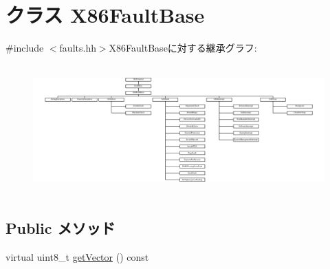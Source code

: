 \hypertarget{classX86ISA_1_1X86FaultBase}{
\section{クラス X86FaultBase}
\label{classX86ISA_1_1X86FaultBase}
}


{\ttfamily \#include $<$faults.hh$>$}X86FaultBaseに対する継承グラフ:\begin{figure}[H]
\begin{center}
\leavevmode
\includegraphics[height=5.00559cm]{classX86ISA_1_1X86FaultBase}
\end{center}
\end{figure}
\subsection*{Public メソッド}
\begin{DoxyCompactItemize}
\item 
virtual uint8\_\-t \hyperlink{classX86ISA_1_1X86FaultBase_a43ecb580ea3927f499dc82682f1b9a6a}{getVector} () const 
\end{DoxyCompactItemize}
